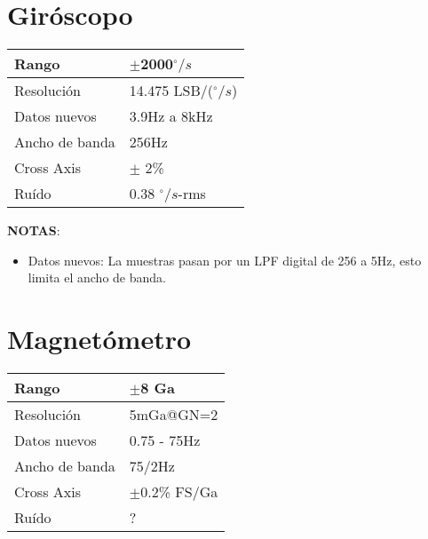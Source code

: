 \documentclass[spanish,12pt,a4paper,titlepage]{report}
\begin{document}
\section{Giróscopo}
\label{sec:gyro}

\begin{table}[H]
\begin{center}
\begin{tabular}{|p{3cm}|p{6.5cm}|}
\hline
Rango & $\pm$2000$^\circ/s$ \\
\hline
Resolución & 14.475 LSB/($^\circ/s$) \\
\hline
Datos nuevos &  3.9Hz a 8kHz\\
\hline
Ancho de banda & 256Hz \\
\hline
Cross Axis & $\pm$ 2\% \\
\hline
Ruído & 0.38 $^\circ/s$-rms \\
\hline
\end{tabular}
\label{tab:gyro}
\end{center}
\end{table}

\textbf{NOTAS}:
\begin{itemize}
\item Datos nuevos: La muestras pasan por un LPF digital de 256 a 5Hz, esto limita el ancho de banda.
\end{itemize}

\newpage
\section{Magnetómetro}
\label{sec:magnetometro}

\begin{table}[H]
\begin{center}
\begin{tabular}{|p{3cm}|p{6.5cm}|}
\hline
Rango & $\pm$8 Ga\\
\hline
Resolución &  5mGa@GN=2\\
\hline
Datos nuevos &  0.75 - 75Hz\\
\hline
Ancho de banda &  75/2Hz\\
\hline
Cross Axis & $\pm$0.2\% FS/Ga \\
\hline
Ruído & ? \\
\hline
\end{tabular}
\label{tab:magn}
\end{center}
\end{table}
\end{document}
